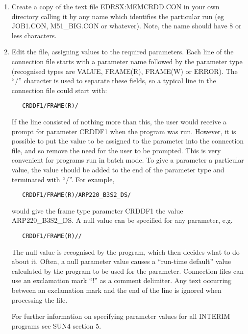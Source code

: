 \begin{enumerate}

\item Create a copy of the text file EDRSX:MEMCRDD.CON in your own directory
calling it by any name which identifies the particular run (eg JOB1.CON,
M51\_BIG.CON or whatever). Note, the name should have 8 or less characters.

\item Edit the file, assigning values to the required parameters. Each line
of the connection file starts with a parameter name followed by the parameter 
type (recognised types are VALUE, FRAME(R), FRAME(W) or ERROR). The ``/'' 
character is used to separate these fields, so a typical line in the 
connection file could start with:

\begin{verbatim}
   CRDDF1/FRAME(R)/
\end{verbatim}

If the line consisted of nothing more than this, the user would receive a prompt
for parameter CRDDF1 when the program was run. However, it is possible to put 
the value to be assigned to the parameter into the connection file, and so 
remove the need for the user to be prompted. This is very convenient for 
programs run in batch mode.
To give a parameter a particular value, the
value should be added to the end of the parameter type and terminated with 
``/''. For example,

\begin{verbatim}
   CRDDF1/FRAME(R)/ARP220_B3S2_DS/ 
\end{verbatim}

would give the frame type parameter CRDDF1 the value ARP220\_B3S2\_DS. A null 
value can be specified for any parameter, e.g.

\begin{verbatim}
   CRDDF1/FRAME(R)//
\end{verbatim}

The null value is recognised by the program, which then decides what to do
about  it. Often, a null parameter value causes a ``run-time default'' value
calculated  by the program to be used for the parameter. Connection files can
use an  exclamation mark ``!'' as a comment delimiter. Any text occurring
between an exclamation mark and the end of the line is ignored when processing
the file.

For further information on specifying parameter values
for all INTERIM programs see SUN4 section 5. 


\end{enumerate}
